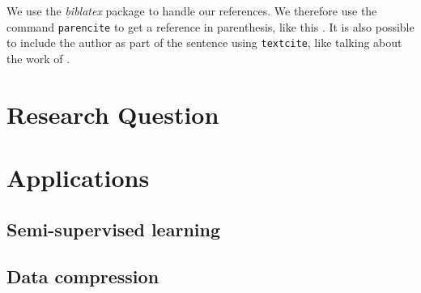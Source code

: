 We use the \emph{biblatex} package to handle our references.  We therefore use the
command \texttt{parencite} to get a reference in parenthesis, like this
\parencite{goodfellow2016nips}.  It is also possible to include the author
as part of the sentence using \texttt{textcite}, like talking about
the work of \textcite{fedus2017many}.

\section{Research Question}

\section{Applications}

\subsection{Semi-supervised learning}

\subsection{Data compression}

